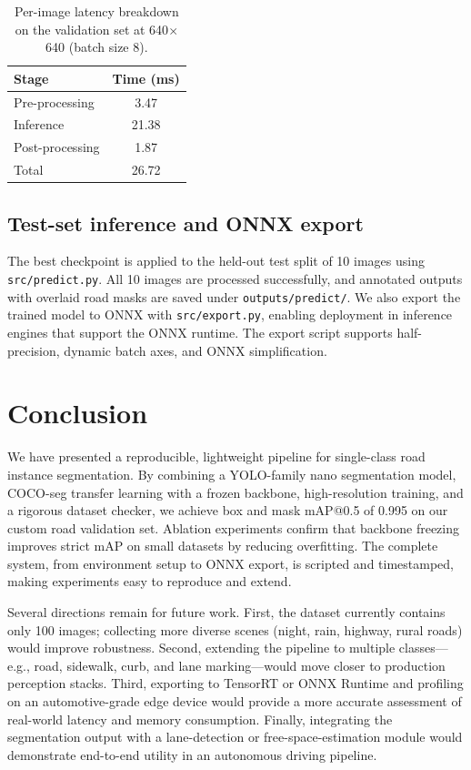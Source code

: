 \documentclass[11pt,a4paper]{article}
\newcommand{\tool}[1]{\texttt{#1}}
\begin{document}
\begin{table}[htbp]
\centering
\caption{Per-image latency breakdown on the validation set at 640$\times$640 (batch size 8).}\label{tab:speed}
\begin{tabular}{lc}
\toprule
\textbf{Stage} & \textbf{Time (ms)} \\
\midrule
Pre-processing  & 3.47 \\
Inference       & 21.38 \\
Post-processing & 1.87 \\
\midrule
Total           & 26.72 \\
\bottomrule
\end{tabular}
\end{table}

\subsection{Test-set inference and ONNX export}

The best checkpoint is applied to the held-out test split of 10 images using \tool{src/predict.py}. All 10 images are processed successfully, and annotated outputs with overlaid road masks are saved under \tool{outputs/predict/}. We also export the trained model to ONNX with \tool{src/export.py}, enabling deployment in inference engines that support the ONNX runtime. The export script supports half-precision, dynamic batch axes, and ONNX simplification.

\section{Conclusion}\label{sec:conclusion}

We have presented a reproducible, lightweight pipeline for single-class road instance segmentation. By combining a YOLO-family nano segmentation model, COCO-seg transfer learning with a frozen backbone, high-resolution training, and a rigorous dataset checker, we achieve box and mask mAP@0.5 of 0.995 on our custom road validation set. Ablation experiments confirm that backbone freezing improves strict mAP on small datasets by reducing overfitting. The complete system, from environment setup to ONNX export, is scripted and timestamped, making experiments easy to reproduce and extend.

Several directions remain for future work. First, the dataset currently contains only 100 images; collecting more diverse scenes (night, rain, highway, rural roads) would improve robustness. Second, extending the pipeline to multiple classes---e.g., road, sidewalk, curb, and lane marking---would move closer to production perception stacks. Third, exporting to TensorRT or ONNX Runtime and profiling on an automotive-grade edge device would provide a more accurate assessment of real-world latency and memory consumption. Finally, integrating the segmentation output with a lane-detection or free-space-estimation module would demonstrate end-to-end utility in an autonomous driving pipeline.



\end{document}
